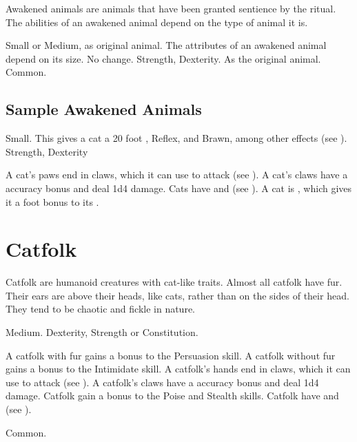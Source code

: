   Awakened animals are animals that have been granted sentience by the  ritual.
  The abilities of an awakened animal depend on the type of animal it is.

   Small or Medium, as original animal.
   The attributes of an awakened animal depend on its size.
   No change.
    Strength,  Dexterity.
   As the original animal.
   Common.

  \subsection{Sample Awakened Animals}


     Small. This gives a cat a 20 foot ,  Reflex, and  Brawn, among other effects (see ).
      Strength,  Dexterity
    \begin{raggeditemize}
       A cat's paws end in claws, which it can use to attack (see ). A cat's claws have a  accuracy bonus and deal 1d4 damage.
       Cats have  and  (see ).
       A cat is , which gives it a  foot bonus to its .
    \end{raggeditemize}

\section{Catfolk}

  Catfolk are humanoid creatures with cat-like traits.
  Almost all catfolk have fur.
  Their ears are above their heads, like cats, rather than on the sides of their head.
  They tend to be chaotic and fickle in nature.

   Medium.
    Dexterity,  Strength or  Constitution.
  \begin{raggeditemize}
     A catfolk with fur gains a  bonus to the Persuasion skill.
     A catfolk without fur gains a  bonus to the Intimidate skill.
     A catfolk's hands end in claws, which it can use to attack (see ). A catfolk's claws have a  accuracy bonus and deal 1d4 damage.
     Catfolk gain a  bonus to the Poise and Stealth skills.
     Catfolk have  and  (see ).
  \end{raggeditemize}
   Common.


